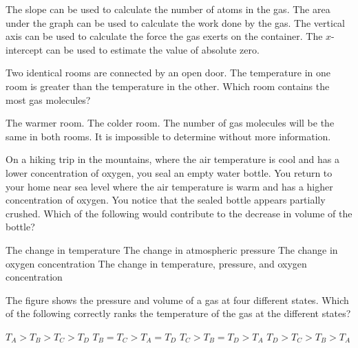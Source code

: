 \documentclass{../../../oss-ap12ibhl}
\begin{document}
\begin{questions}
  \begin{minipage}{.35\textwidth}
  \end{minipage}
  \begin{minipage}{.6\textwidth}
    \begin{choices}
      \choice The slope can be used to calculate the number of atoms in the gas.
      \choice The area under the graph can be used to calculate the work done by
      the gas.
      \choice The vertical axis can be used to calculate the force the gas
      exerts on the container.
      \choice The $x$-intercept can be used to estimate the value of absolute
      zero.
    \end{choices}
  \end{minipage}
  \vspace{.3in}
  
  \question Two identical rooms are connected by an open door. The temperature
  in one room is greater than the temperature in the other. Which room contains
  the most gas molecules?
  \begin{choices}
    \choice The warmer room.
    \choice The colder room.
    \choice The number of gas molecules will be the same in both rooms.
    \choice It is impossible to determine without more information.
  \end{choices}
  \vspace{.7in}
  \newpage
    
  \question On a hiking trip in the mountains, where the air temperature is
  cool and has a lower concentration of oxygen, you seal an empty water bottle.
  You return to your home near sea level where the air temperature is warm and
  has a higher concentration of oxygen. You notice that the sealed bottle
  appears partially crushed. Which of the following would contribute to the
  decrease in volume of the bottle?
  \begin{choices}
    \choice The change in temperature
    \choice The change in atmospheric pressure
    \choice The change in oxygen concentration
    \choice The change in temperature, pressure, and oxygen concentration
  \end{choices}
    
  \question The figure shows the pressure and volume of a gas at four different
  states. Which of the following correctly ranks the temperature of the gas
  at the different states?

  \begin{minipage}{.3\textwidth}
  \end{minipage}
  \begin{minipage}{.6\textwidth}
    \begin{choices}
      \choice $T_A>T_B>T_C>T_D$
      \choice $T_B=T_C>T_A=T_D$
      \choice $T_C>T_B=T_D>T_A$
      \choice $T_D>T_C>T_B>T_A$
    \end{choices}
  \end{minipage}
  

\end{questions}
\end{document}
